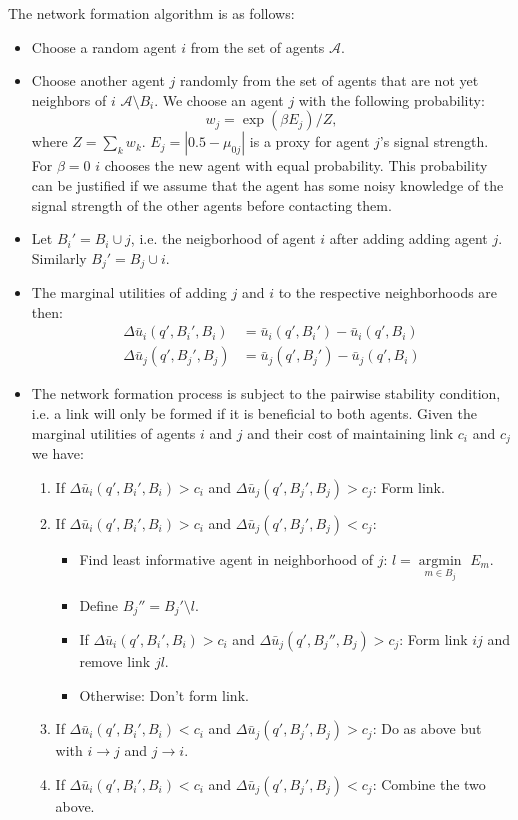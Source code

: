 \documentclass[10pt,a4paper]{article}
\begin{document}
The network formation algorithm is as follows:
\begin{itemize}
\item Choose a random agent $i$ from the set of agents $\mathcal{A}$.
\item Choose another agent $j$ randomly from the set of agents that are not yet neighbors of $i$ $\mathcal{A} \setminus B_i $. We choose an agent $j$ with the following probability:
\begin{equation}
w_j = \exp(\beta E_j)/Z,
\end{equation}
where $Z = \sum_k w_k$. $E_j = |0.5-\mu_{0j}|$ is a proxy for agent $j$'s signal strength. For $\beta = 0$ $i$ chooses the new agent with equal probability. This probability can be justified if we assume that the agent has some noisy knowledge of the signal strength of the other agents before contacting them.
\item Let $B_i' =  B_i \cup j$, i.e. the neigborhood of agent $i$ after adding adding agent $j$. Similarly $B_j' =  B_j \cup i$.
\item The marginal utilities of adding $j$ and $i$ to the respective neighborhoods are then:
\begin{equation}
\begin{aligned}
\Delta \bar{u}_i(q',B_i',B_i) &= \bar{u}_i(q',B_i')-\bar{u}_i(q',B_i) \\
\Delta \bar{u}_j(q',B_j',B_j) &= \bar{u}_j(q',B_j')-\bar{u}_j(q',B_i) 
\end{aligned}
\end{equation} 
\item The network formation process is subject to the pairwise stability condition, i.e. a link will only be formed if it is beneficial to both agents. Given the marginal utilities of agents $i$ and $j$ and their cost of maintaining link $c_i$ and $c_j$  we have:
\begin{enumerate}
\item If $\Delta \bar{u}_i(q',B_i',B_i) > c_i$ and $\Delta \bar{u}_j(q',B_j',B_j) > c_j$: Form link.
\item If $\Delta \bar{u}_i(q',B_i',B_i) > c_i$ and $\Delta \bar{u}_j(q',B_j',B_j) < c_j$:
\begin{itemize}
\item Find least informative agent in neighborhood of $j$: $l = \underset{m \in B_j}{\operatorname{argmin}}$ $E_m $.
\item Define $B_j'' = B_j' \setminus l$.
\item If $\Delta \bar{u}_i(q',B_i',B_i) > c_i$ and $\Delta \bar{u}_j(q',B_j'',B_j) > c_j$: Form link $ij$ and remove link $jl$.
\item Otherwise: Don't form link.
\end{itemize}
\item If $\Delta \bar{u}_i(q',B_i',B_i) < c_i$ and $\Delta \bar{u}_j(q',B_j',B_j) > c_j$: Do as above but with $i\rightarrow j$ and $j\rightarrow i$.
\item If $\Delta \bar{u}_i(q',B_i',B_i) < c_i$ and $\Delta \bar{u}_j(q',B_j',B_j) < c_j$: Combine the two above.
\end{enumerate}
\end{itemize}
\end{document}
